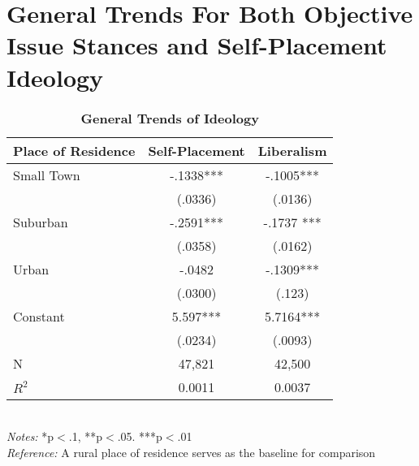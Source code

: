 \documentclass[12pt, titlepage]{article}
\newcommand\e{\emph}
\newcommand\tb{\textbf}
\begin{document}
\section{General Trends For Both Objective Issue Stances and Self-Placement Ideology}

\begin{singlespace}
	\begin{table}[H]
		\centering
		\def\arraystretch{1}
		\caption{\tb{General Trends of Ideology}}
		\begin{tabulary}{\linewidth}{l c c}
			\\
			\hline
			\tb{Place of Residence}&\tb{Self-Placement} & \tb{Liberalism} \\
			\hline
			Small Town&-.1338***& -.1005*** \\    
			& (.0336) & (.0136)  \\
			Suburban & -.2591*** &-.1737 ***\\ 
			& (.0358) &(.0162) \\
			Urban   & -.0482 &-.1309***  \\
			& (.0300)  &(.123)  \\
			Constant   & 5.597*** &5.7164*** \\
			&(.0234) & (.0093)\\
			N  & 47,821 & 42,500 \\
			$R^2$	& 0.0011 & 0.0037 \\
			\hline                                       
		\end{tabulary}
		\\
		\e{Notes:} *p$<$.1, **p$<$.05. ***p$<$.01 \\
		\e{Reference:} A rural place of residence serves as the baseline for comparison
		\label{table102}
	\end{table}
\end{singlespace}
\end{document}
